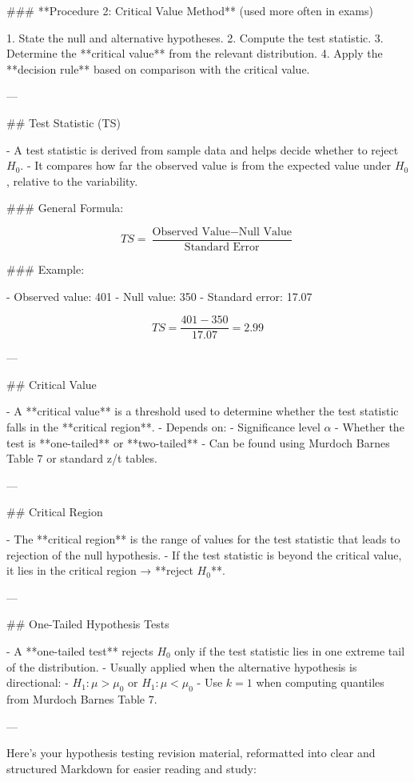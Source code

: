 ### **Procedure 2: Critical Value Method** (used more often in exams)

1. State the null and alternative hypotheses.
2. Compute the test statistic.
3. Determine the **critical value** from the relevant distribution.
4. Apply the **decision rule** based on comparison with the critical value.

---

## Test Statistic (TS)

- A test statistic is derived from sample data and helps decide whether to reject \( H_0 \).
- It compares how far the observed value is from the expected value under \( H_0 \), relative to the variability.

### General Formula:

\[
TS = \frac{\text{Observed Value} - \text{Null Value}}{\text{Standard Error}}
\]

### Example:

- Observed value: 401  
- Null value: 350  
- Standard error: 17.07  

\[
TS = \frac{401 - 350}{17.07} = 2.99
\]

---

## Critical Value

- A **critical value** is a threshold used to determine whether the test statistic falls in the **critical region**.
- Depends on:
  - Significance level \( \alpha \)
  - Whether the test is **one-tailed** or **two-tailed**
- Can be found using Murdoch Barnes Table 7 or standard z/t tables.

---

## Critical Region

- The **critical region** is the range of values for the test statistic that leads to rejection of the null hypothesis.
- If the test statistic is beyond the critical value, it lies in the critical region → **reject \( H_0 \)**.

---

## One-Tailed Hypothesis Tests

- A **one-tailed test** rejects \( H_0 \) only if the test statistic lies in one extreme tail of the distribution.
- Usually applied when the alternative hypothesis is directional:
  - \( H_1: \mu > \mu_0 \) or \( H_1: \mu < \mu_0 \)
- Use \( k = 1 \) when computing quantiles from Murdoch Barnes Table 7.

---

Here’s your hypothesis testing revision material, reformatted into clear and structured Markdown for easier reading and study:

